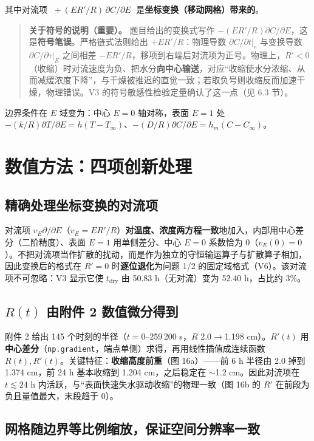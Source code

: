 \documentclass[11pt]{ctexart}
\begin{document}
其中对流项 $\boxed{\;+(E R'/R)\,\partial C/\partial E\;}$ 是\textbf{坐标变换（移动网格）带来的}。

\begin{quote}
\textbf{关于符号的说明（重要）。} 题目给出的变换式写作 $-(E R'/R)\partial C/\partial E$，这是\textbf{符号笔误}。严格链式法则给出 $+E R'/R$：物理导数 $\partial C/\partial t|_r$ 与变换导数 $\partial C/\partial\tau|_E$ 之间相差 $-ER'/R$，移项到右端后对流项为正号。物理上，$R'<0$（收缩）时对流速度为负、把水分\textbf{向中心输送}，对应``收缩使水分浓缩、从而减缓浓度下降''，与干燥被推迟的直觉一致；若取负号则收缩反而加速干燥，物理错误。V3 的符号敏感性检验定量确认了这一点（见 6.3 节）。
\end{quote}

边界条件在 $E$ 域变为：中心 $E=0$ 轴对称，表面 $E=1$ 处 $-(k/R)\partial T/\partial E=h(T-T_\infty)$、$-(D/R)\partial C/\partial E=h_m(C-C_\infty)$。

\section{数值方法：四项创新处理}

\subsection{精确处理坐标变换的对流项}

对流项 $v_E\partial/\partial E$（$v_E=E R'/R$）\textbf{对温度、浓度两方程一致}地加入，内部用中心差分（二阶精度）、表面 $E=1$ 用单侧差分、中心 $E=0$ 系数恰为 0（$v_E(0)=0$）。不把对流项当作扩散的扰动，而是作为独立的守恒输运算子与扩散算子相加，因此变换后的格式在 $R'=0$ 时\textbf{逐位退化}为问题 1/2 的固定域格式（V6）。该对流项不可忽略：V3 显示它使 $t_\text{dry}$ 由 50.83 h（无对流）变为 52.40 h，占比约 3\%。

\subsection{$R(t)$ 由附件 2 数值微分得到}

附件 2 给出 145 个时刻的半径（$t=0$--259\,200 s，$R$ 2.0$\to$1.198 cm）。$R'(t)$ 用\textbf{中心差分}（\texttt{np.gradient}，端点单侧）求得，再用线性插值成连续函数 $R(t),R'(t)$。关键特征：\textbf{收缩高度前重}（图 16a）——前 6 h 半径由 2.0 掉到 1.374 cm，前 24 h 基本收缩到 1.204 cm，之后稳定在 $\sim$1.2 cm。因此对流项在 $t\lesssim24$ h 内活跃，与``表面快速失水驱动收缩''的物理一致（图 16b 的 $R'$ 在前段为负且量值最大，末段趋于 0）。

\subsection{网格随边界等比例缩放，保证空间分辨率一致}
\end{document}
